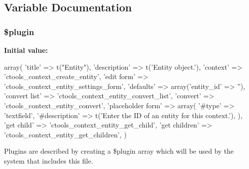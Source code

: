 \subsection{Variable Documentation}
\hypertarget{profiles_2dosomething_2modules_2contrib_2ctools_2plugins_2contexts_2entity_8inc_ada8a7130088351710bb02ed622d6bf65}{
\subsubsection[{\$plugin}]{\setlength{\rightskip}{0pt plus 5cm}\$plugin}}
\label{profiles_2dosomething_2modules_2contrib_2ctools_2plugins_2contexts_2entity_8inc_ada8a7130088351710bb02ed622d6bf65}
{\bfseries Initial value:}
\begin{DoxyCode}
 array(
  'title' => t("Entity"),
  'description' => t('Entity object.'),
  'context' => 'ctools_context_create_entity',
  'edit form' => 'ctools_context_entity_settings_form',
  'defaults' => array('entity_id' => ''),
  'convert list' => 'ctools_context_entity_convert_list',
  'convert' => 'ctools_context_entity_convert',
  'placeholder form' => array(
    '#type' => 'textfield',
    '#description' => t('Enter the ID of an entity for this context.'),
  ),
  'get child' => 'ctools_context_entity_get_child',
  'get children' => 'ctools_context_entity_get_children',
)
\end{DoxyCode}
Plugins are described by creating a \$plugin array which will be used by the system that includes this file. 